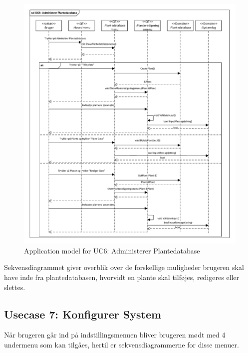 \begin{figure}[!h]
\centering 
\includegraphics[width={\textwidth}, trim=0 0 0 0, clip=true] {../fig/SD_autogreen_UC_6_Adminstrer_Plantedatabase.pdf}
\caption{Application model for UC6: Administerer Plantedatabase}
\label{fig:SD_UC6}
\end{figure}

Sekvensdiagrammet giver overblik over de forskellige muligheder brugeren skal have inde fra plantedatabasen, hvorvidt en plante skal tilføjes, redigeres eller slettes.

\clearpage

\subsection{Usecase 7: Konfigurer System}

Når brugeren går ind på indstillingsmenuen bliver brugeren mødt med 4 undermenu som kan tilgåes, hertil er sekvensdiagrammerne for disse menuer.

